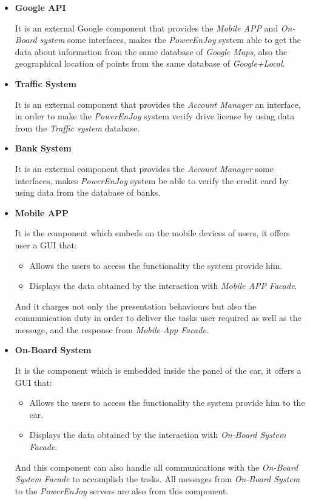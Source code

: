 \documentclass[a4paper,11pt]{article}
\begin{document}
		\begin{itemize}
			\item \textbf{Google API} 
			
It is an external Google component that provides the \textsl{Mobile APP} and \textsl{On-Board system} some interfaces, makes the \textsl{PowerEnJoy} system able to get the data about information from the same database of \textsl{Google Maps}, also the geographical location of points from the same database of \textsl{Google+Local}.
			
			\item \textbf{Traffic System}
			
It is an external component that provides the \textsl{Account Manager} an interface, in order to make the \textsl{PowerEnJoy} system verify drive license by using data from the \textsl{Traffic system} database.

			\item \textbf{Bank System}
			
It is an external component that provides the \textsl{Account Manager} some interfaces, makes \textsl{PowerEnJoy} system be able to verify the credit card by using data from the database of banks.

			\item \textbf{Mobile APP}

It is the component which embeds on the mobile devices of users, it offers user a GUI that:
			\begin{itemize}
				\item Allows the users to access the functionality the system provide him.
				\item Displays the data obtained by the interaction with \textsl{Mobile APP Facade}.
			\end{itemize}
And it charges not only the presentation behaviours but also the communication duty in order to deliver the tasks user required as well as the message, and the response from \textsl{Mobile App Facade}.

			\item \textbf{On-Board System}
			
It is the component which is embedded inside the panel of the car, it offers a GUI that:
			\begin{itemize}
				\item Allows the users to access the functionality the system provide him to the car.
				\item Displays the data obtained by the interaction with \textsl{On-Board System Facade}.
			\end{itemize}
And this component can also handle all communications with the \textsl{On-Board System Facade} to accomplish the tasks. All messages from \textsl{On-Board System} to the \textsl{PowerEnJoy} servers are also from this component.


\end{itemize}
\end{document}
